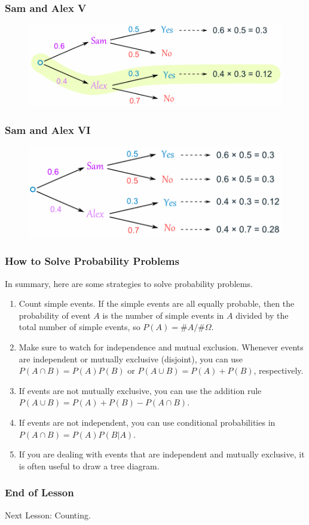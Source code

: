 \documentclass[xcolor=dvipsnames]{beamer}
\begin{document}
\begin{frame}
  \frametitle{Sam and Alex V}
\begin{figure}[h]
\includegraphics[scale=\sam]{./diagrams/sam5.png}
\end{figure}
\end{frame}

\begin{frame}
  \frametitle{Sam and Alex VI}
\begin{figure}[h]
\includegraphics[scale=\sam]{./diagrams/sam6.png}
\end{figure}
\end{frame}

\begin{frame}
  \frametitle{How to Solve Probability Problems}
In summary, here are some strategies to solve probability problems.
\begin{enumerate}
\item<1-> Count simple events. If the simple events are all equally
  probable, then the probability of event $A$ is the number of simple
  events in $A$ divided by the total number of simple events, so
  $P(A)=\#A/\#\Omega$.
\item<2-> Make sure to watch for independence and mutual exclusion.
  Whenever events are independent or mutually exclusive (disjoint),
  you can use $P(A\cap{}B)=P(A)P(B)$ or $P(A\cup{}B)=P(A)+P(B)$,
  respectively.
\item<3-> If events are not mutually exclusive, you can use the
  addition rule $P(A\cup{}B)=P(A)+P(B)-P(A\cap{}B)$.
\item<4-> If events are not independent, you can use conditional
  probabilities in $P(A\cap{}B)=P(A)P(B|A)$.
\item<5-> If you are dealing with events that are independent and
  mutually exclusive, it is often useful to draw a tree diagram.
\end{enumerate}
\end{frame}

\begin{frame}
  \frametitle{End of Lesson}
Next Lesson: Counting.
\end{frame}
\end{document}

